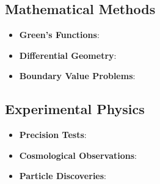 \documentclass[12pt,a4paper]{article}
\begin{document}
	\subsection*{Mathematical Methods}
	\begin{itemize}
		\item \textbf{Green's Functions}: \citet{jackson1998,duffy2001,roach1982}
		\item \textbf{Differential Geometry}: \citet{misner1973,abraham1988}
		\item \textbf{Boundary Value Problems}: \citet{stakgold1998,haberman2004}
	\end{itemize}
	
	\subsection*{Experimental Physics}
	\begin{itemize}
		\item \textbf{Precision Tests}: \citet{will2014,adelberger2003,murphy2003}
		\item \textbf{Cosmological Observations}: \citet{planck2020,weinberg2008}
		\item \textbf{Particle Discoveries}: \citet{aad2012,chatrchyan2012,abbott2017}
	\end{itemize}
	
\end{document}
